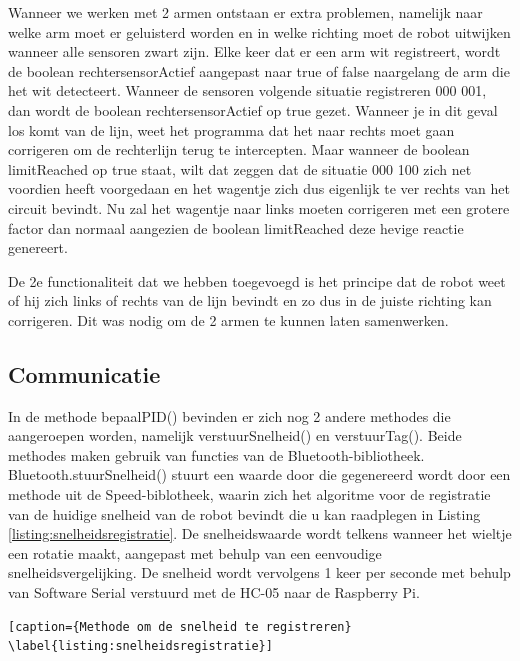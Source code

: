 Wanneer we werken met 2 armen ontstaan er extra problemen, namelijk naar welke arm moet er geluisterd worden en in welke richting moet de robot uitwijken wanneer alle sensoren zwart zijn. Elke keer dat er een arm wit registreert, wordt de boolean rechtersensorActief aangepast naar true of false naargelang de arm die het wit detecteert. Wanneer de sensoren volgende situatie registreren 000 001, dan wordt de boolean rechtersensorActief op true gezet. Wanneer je in dit geval los komt van de lijn, weet het programma dat het naar rechts moet gaan corrigeren om de rechterlijn terug te intercepten. Maar wanneer de boolean limitReached op true staat, wilt dat zeggen dat de situatie 000 100 zich net voordien heeft voorgedaan en het wagentje zich dus eigenlijk te ver rechts van het circuit bevindt. Nu zal het wagentje naar links moeten corrigeren met een grotere factor dan normaal aangezien de boolean limitReached deze hevige reactie genereert.


De 2e functionaliteit dat we hebben toegevoegd is het principe dat de robot weet of hij zich links of rechts van de lijn bevindt en zo dus in de juiste richting kan corrigeren. Dit was nodig om de 2 armen te kunnen laten samenwerken.


\subsection {Communicatie}

In de methode bepaalPID() bevinden er zich nog 2 andere methodes die aangeroepen worden, namelijk verstuurSnelheid() en verstuurTag(). Beide methodes maken gebruik van functies van de Bluetooth-bibliotheek. Bluetooth.stuurSnelheid() stuurt een waarde door die gegenereerd wordt door een methode uit de Speed-biblotheek, waarin zich het algoritme voor de registratie van de huidige snelheid van de robot bevindt die u kan raadplegen in Listing \ref{listing:snelheidsregistratie}. De snelheidswaarde wordt telkens wanneer het wieltje een rotatie maakt, aangepast met behulp van een eenvoudige snelheidsvergelijking. De snelheid wordt vervolgens 1 keer per seconde met behulp van Software Serial verstuurd met de HC-05 naar de Raspberry Pi. 


\begin{lstlisting}[caption={Methode om de snelheid te registreren} \label{listing:snelheidsregistratie}]
\end{lstlisting}

